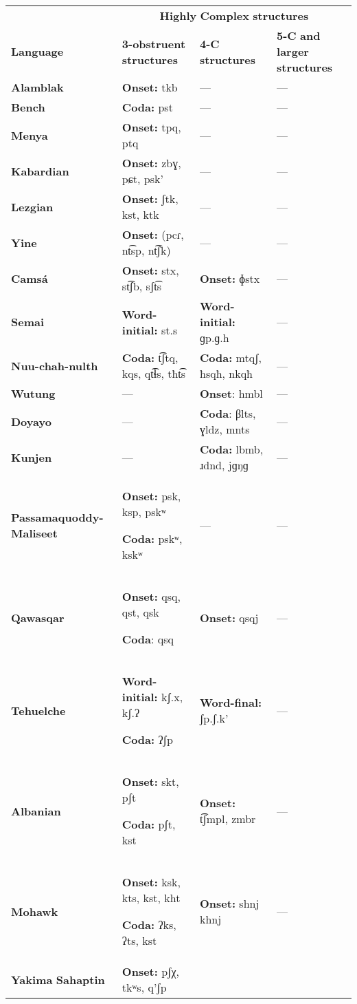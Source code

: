 \begin{table}
\begin{tabularx}{\textwidth}{XXXX}
 & \multicolumn{3}{c}{ \textbf{Highly} \textbf{Complex} \textbf{structures}}\\
\lsptoprule
\textbf{Language} & \textbf{3-obstruent} \textbf{structures} & \textbf{4-C} \textbf{structures} & \textbf{5-C} \textbf{and} \textbf{larger} \textbf{structures}\\
\textbf{Alamblak} & \textbf{Onset:} tkb & — & —\\
\textbf{Bench} & \textbf{Coda:} pst & — & —\\
\textbf{Menya} & \textbf{Onset:} tpq, ptq & — & —\\
\textbf{Kabardian} & \textbf{Onset:} zbɣ, pɕt, psk’ & — & —\\
\textbf{Lezgian} & \textbf{Onset:} ʃtk, kst, ktk & — & —\\
\textbf{Yine} & \textbf{Onset:} (pcɾ, nt͡sp, nt͡ʃk) & — & —\\
{\bfseries Camsá} & \textbf{Onset:} stx, st͡ʃb, sʃt͡s & { \textbf{Onset:} ɸstx} & —\\
\textbf{Semai} & \textbf{Word-initial:} st.s & \textbf{Word-initial:} ɡp.ɡ.h & —\\
\textbf{Nuu-chah-nulth} & \textbf{Coda:} t͡ʃtq, kqs, qt͡ɬs, tħt͡s & \textbf{Coda:} mtqʃ, ħsqħ, nkqħ & —\\
\textbf{Wutung} & — & \textbf{Onset}: hmbl & —\\
\textbf{Doyayo} & — & \textbf{Coda}: βlts, ɣldz, mnts & —\\
\textbf{Kunjen} & — & \textbf{Coda:} lbmb, ɹdnd, jɡŋɡ & —\\
\textbf{Passamaquoddy-Maliseet} & { \textbf{Onset:} psk, ksp, pskʷ}

{ \textbf{Coda:} pskʷ, kskʷ}  & — & —\\
\textbf{Qawasqar} & \textbf{Onset:} qsq, qst, qsk

\textbf{Coda}: qsq & \textbf{Onset:} qsqj & —\\
\textbf{Tehuelche} & \textbf{Word-initial:} kʃ.x, kʃ.ʔ

\textbf{Coda:} ʔʃp & \textbf{Word-final:} ʃp.ʃ.k’ & —\\
\textbf{Albanian} & \textbf{Onset:} skt, pʃt

\textbf{Coda:} pʃt, kst & \textbf{Onset:} t͡ʃmpl, zmbr & —\\
\textbf{Mohawk} & \textbf{Onset:} ksk, kts, kst, kht 

\textbf{Coda:} ʔks, ʔts, kst & \textbf{Onset:} shnj khnj & —\\
\textbf{Yakima} \textbf{Sahaptin} & \textbf{Onset:} pʃχ, tkʷs, q’ʃp


\end{tabularx}
\end{table}
